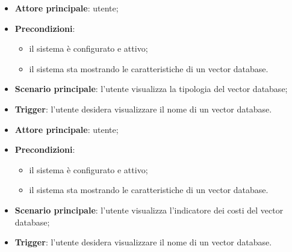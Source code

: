 \documentclass[10pt, a4paper]{article}
\begin{document}
    \begin{itemize}
        \item \textbf{Attore principale}: utente;
        \item \textbf{Precondizioni}:
            \begin{itemize}
                \item il sistema è configurato e attivo;
                \item il sistema sta mostrando le caratteristiche di un vector database.
            \end{itemize}
        \item \textbf{Scenario principale}: l'utente visualizza la tipologia del vector database;
        \item \textbf{Trigger}: l’utente desidera visualizzare il nome di un vector database.
    \end{itemize}

    \begin{itemize}
        \item \textbf{Attore principale}: utente;
        \item \textbf{Precondizioni}:
            \begin{itemize}
                \item il sistema è configurato e attivo;
                \item il sistema sta mostrando le caratteristiche di un vector database.
            \end{itemize}
        \item \textbf{Scenario principale}: l'utente visualizza l'indicatore dei costi del vector database;
        \item \textbf{Trigger}: l’utente desidera visualizzare il nome di un vector database.
    \end{itemize}
    
\end{document}
